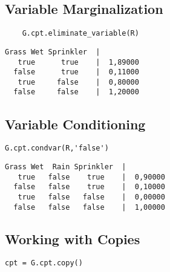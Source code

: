 \documentclass[10pt,a4paper]{report}
\begin{document}
\subsection{Variable Marginalization}

\begin{verbatim}
	G.cpt.eliminate_variable(R)
\end{verbatim}

\begin{verbatim}
Grass Wet Sprinkler  |
   true      true    |  1,89000
  false      true    |  0,11000
   true     false    |  0,80000
  false     false    |  1,20000
\end{verbatim}


\subsection{Variable Conditioning}

\begin{verbatim}
G.cpt.condvar(R,'false')
\end{verbatim}

\begin{verbatim}
Grass Wet  Rain Sprinkler  |
   true   false    true    |  0,90000
  false   false    true    |  0,10000
   true   false   false    |  0,00000
  false   false   false    |  1,00000
\end{verbatim}

\subsection{Working with Copies}

\begin{verbatim}
cpt = G.cpt.copy()
\end{verbatim}


\end{document}
